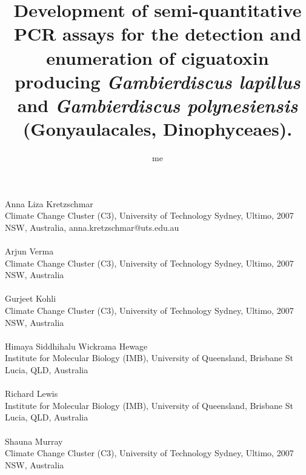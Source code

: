 \documentclass[12pt]{article}
\title{Development of semi-quantitative PCR assays for the detection and enumeration of ciguatoxin producing \emph{Gambierdiscus lapillus} and \emph{Gambierdiscus polynesiensis} (Gonyaulacales, Dinophyceaes).}
\author{me}
\date{}
\begin{document}
\maketitle
\paragraph{}Anna Liza Kretzschmar\\
Climate Change Cluster (C3), University of Technology Sydney, Ultimo, 2007 NSW, Australia, anna.kretzschmar@uts.edu.au
\paragraph{}Arjun Verma \\
Climate Change Cluster (C3), University of Technology Sydney, Ultimo, 2007 NSW, Australia
\paragraph{}Gurjeet Kohli\\
Climate Change Cluster (C3), University of Technology Sydney, Ultimo, 2007 NSW, Australia
\paragraph{}
Himaya Siddhihalu Wickrama Hewage\\
Institute for Molecular Biology (IMB), University of Queensland,  Brisbane St Lucia, QLD, Australia
\paragraph{}Richard Lewis\\
Institute for Molecular Biology (IMB), University of Queensland,  Brisbane St Lucia, QLD, Australia
\paragraph{}Shauna Murray\\
Climate Change Cluster (C3), University of Technology Sydney, Ultimo, 2007 NSW, Australia
\newpage
\end{document}
